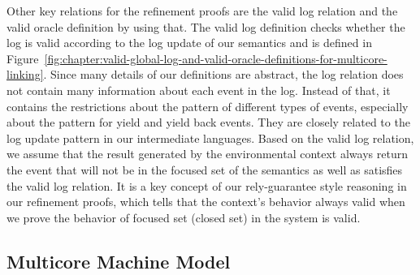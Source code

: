 Other key relations for the refinement proofs are the valid log relation and the valid oracle definition by using that.
The valid log definition checks whether the log is valid according to the log update of our semantics and
is defined in Figure~\ref{fig:chapter:valid-global-log-and-valid-oracle-definitions-for-multicore-linking}.
Since many details of our definitions are abstract, the log relation does not contain many information 
about each event in the log.
Instead of that, it contains the restrictions about the pattern of different types of events, especially about the pattern for yield and  yield back events.
They are closely related to the log update pattern in our intermediate languages. 
Based on the valid log relation, 
we assume that the result generated by the environmental context always return the event that 
will not be in the focused set of the semantics as well as satisfies the valid log relation.
It is a key concept of our rely-guarantee style reasoning in our refinement proofs, which tells that 
the context's behavior always valid when we prove the behavior of focused set (closed set) in the system 
is valid. 



\subsection{Multicore Machine Model}
\label{chapter:linking:subsec:multicore-machine-model}


